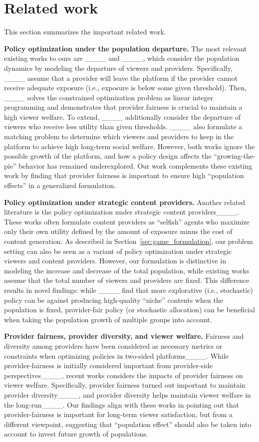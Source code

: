 \section{Related work}
\label{app:related_work}

This section summarizes the important related work.

\textbf{Policy optimization under the population departure.} \quad The most relevant existing works to ours are ____ and ____, which consider the population dynamics by modeling the departure of viewers and providers. Specifically, ____ assume that a provider will leave the platform if the provider cannot receive adequate exposure (i.e., exposure is below some given threshold). Then, ____ solves the constrained optimization problem as linear integer programming and demonstrates that provider fairness is crucial to maintain a high viewer welfare. To extend, ____ additionally consider the departure of viewers who receive less utility than given thresholds. ____ also formulate a matching problem to determine which viewers and providers to keep in the platform to achieve high long-term social welfare. However, both works ignore the possible growth of the platform, and how a policy design affects the ``growing-the-pie'' behavior has remained underexplored. Our work complements these existing work by finding that provider fairness is important to ensure high ``population effects'' in a generalized formulation.

\textbf{Policy optimization under strategic content providers.} \quad
Another related literature is the policy optimization under strategic content providers____. These works often formulate content providers as ``selfish'' agents who maximize only their own utility defined by the amount of exposure minus the cost of content generation. As described in Section~\ref{sec:game_formulation}, our problem setting can also be seen as a variant of policy optimization under strategic viewers and content providers. However, our formulation is distinctive in modeling the increase and decrease of the total population, while existing works assume that the total number of viewers and providers are fixed. This difference results in novel findings: while ____ find that more explorative (i.e., stochastic) policy can be against producing high-quality ``niche'' contents when the population is fixed, provider-fair policy (or stochastic allocation) can be beneficial when taking the population growth of multiple groups into account.

\textbf{Provider fairness, provider diversity, and viewer welfare.}
Fairness and diversity among providers have been considered as necessary metrics or constraints when optimizing policies in two-sided platforms____. While provider-fairness is initially considered important from provider-side perspectives____, recent works considers the impacts of provider fairness on viewer welfare. Specifically, provider fairness turned out important to maintain provider diversity____, and provider diversity helps maintain viewer welfare in the long-run____. Our findings align with these works in pointing out that provider-fairness is important for long-term viewer satisfaction, but from a different viewpoint, suggesting that ``population effect'' should also be taken into account to invest future growth of populations.